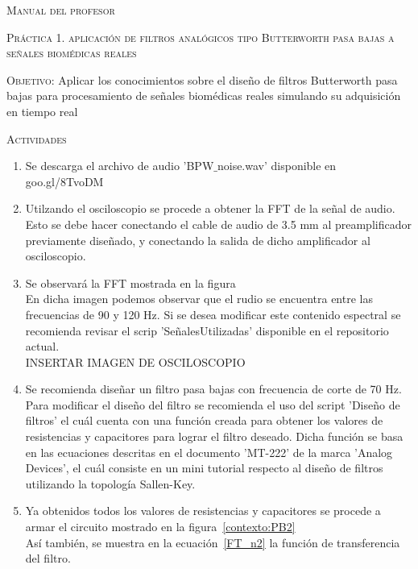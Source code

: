 \documentclass[10pt,letterpaper,spanish,twoside]{report}
\begin{document}
\docdate

\begin{center}
 \textsc{\asignatura}\vspace{.2em}
\end{center}

\textsc{Manual del profesor}

\textsc{Práctica 1. aplicación de filtros analógicos tipo Butterworth pasa bajas a señales biomédicas reales}

\textsc{Objetivo:} Aplicar los conocimientos sobre el diseño de filtros Butterworth pasa bajas para procesamiento de señales biomédicas reales simulando su adquisición en tiempo real

\textsc{Actividades}
\begin{enumerate}
 \item Se descarga el archivo de audio 'BPW$\_$noise.wav' disponible en goo.gl/8TvoDM
 \item Utilzando el osciloscopio se procede a obtener la FFT de la señal de audio. Esto se debe hacer conectando el cable de audio de 3.5 mm al preamplificador previamente diseñado, y conectando la salida de dicho amplificador al osciloscopio.
 \item Se observará la FFT mostrada en la figura%
 \\En dicha imagen podemos observar que el rudio se encuentra entre las frecuencias de 90 y 120 Hz. Si se desea modificar este contenido espectral se recomienda revisar el scrip 'SeñalesUtilizadas' disponible en el repositorio actual.
 \\ INSERTAR IMAGEN DE OSCILOSCOPIO
 \item Se recomienda diseñar un filtro pasa bajas con frecuencia de corte de 70 Hz. Para modificar el diseño del filtro se recomienda el uso del script 'Diseño de filtros' el cuál cuenta con una función creada para obtener los valores de resistencias y capacitores para lograr el filtro deseado. Dicha función se basa en las ecuaciones descritas en el documento 'MT-222' de la marca 'Analog Devices', el cuál consiste en un mini tutorial respecto al diseño de filtros utilizando la topología Sallen-Key.
 \item Ya obtenidos todos los valores de resistencias y capacitores se procede a armar el circuito mostrado en la figura~\ref{contexto:PB2}
 \\Así también, se muestra en la ecuación~\eqref{FT_n2} la función de transferencia del filtro.
 \begin{equation}

\end{equation}
\end{enumerate}
\end{document}
